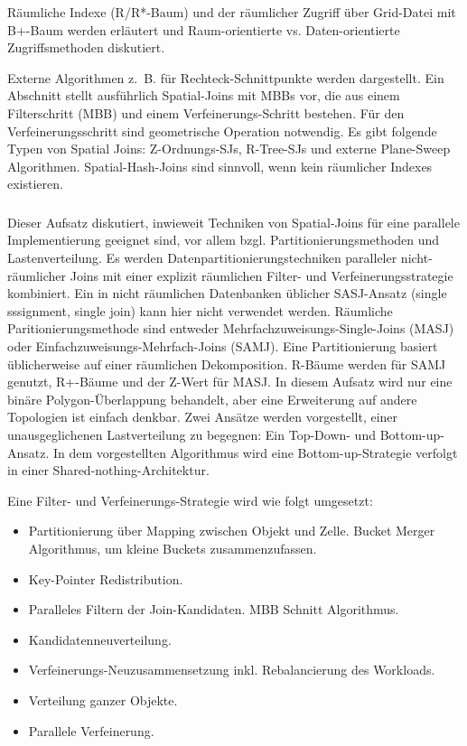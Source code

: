 \documentclass[a4paper,12pt,twoside]{article}
\begin{document}
Räumliche Indexe (R/R*-Baum) und der räumlicher Zugriff über Grid-Datei mit B+-Baum werden erläutert und Raum-orientierte vs. Daten-orientierte Zugriffsmethoden diskutiert. 

Externe Algorithmen z.~B. für Rechteck-Schnittpunkte werden dargestellt. Ein Abschnitt stellt ausführlich Spatial-Joins mit MBBs vor, die aus einem Filterschritt (MBB) und einem Verfeinerungs-Schritt bestehen. Für den Verfeinerungsschritt sind geometrische Operation notwendig. Es gibt folgende Typen von Spatial Joins: Z-Ordnungs-SJs, R-Tree-SJs und externe Plane-Sweep Algorithmen. Spatial-Hash-Joins sind sinnvoll, wenn kein räumlicher Indexes existieren.

\subsubsection*{}

Dieser Aufsatz diskutiert, inwieweit Techniken von Spatial-Joins für eine parallele Implementierung geeignet sind, vor allem bzgl. Partitionierungsmethoden und Lastenverteilung. Es werden Daten\-partitionierungs\-techniken paralleler nicht-räumlicher Joins mit einer explizit räumlichen Filter- und Verfeinerungsstrategie kombiniert. Ein in nicht räumlichen Datenbanken üblicher SASJ-Ansatz (single sssignment, single join) kann hier nicht verwendet werden. Räumliche Paritionierungsmethode sind entweder Mehrfachzuweisungs-Single-Joins (MASJ) oder Einfachzuweisungs-Mehrfach-Joins (SAMJ). Eine Partitionierung basiert üblicherweise auf einer räumlichen Dekomposition. R-Bäume werden für SAMJ genutzt, R+-Bäume und der Z-Wert für MASJ. In diesem Aufsatz wird nur eine binäre Polygon-Überlappung behandelt, aber eine Erweiterung auf andere Topologien ist einfach denkbar. Zwei Ansätze werden vorgestellt, einer unausgeglichenen Lastverteilung zu begegnen: Ein Top-Down- und Bottom-up-Ansatz. In dem vorgestellten Algorithmus wird eine Bottom-up-Strategie verfolgt in einer Shared-nothing-Architektur.

Eine Filter- und Verfeinerungs-Strategie wird wie folgt umgesetzt:

\begin{itemize}
	 \item Partitionierung über Mapping zwischen Objekt und Zelle. Bucket Merger Algorithmus, um kleine Buckets zusammenzufassen. 
	 \item Key-Pointer Redistribution.
	 \item Paralleles Filtern der Join-Kandidaten. MBB Schnitt Algorithmus.
	 \item Kandidatenneuverteilung.
	 \item Verfeinerungs-Neuzusammensetzung inkl. Rebalancierung des Workloads.
	 \item Verteilung ganzer Objekte. 
	 \item Parallele Verfeinerung.
 \end{itemize}
\end{document}
